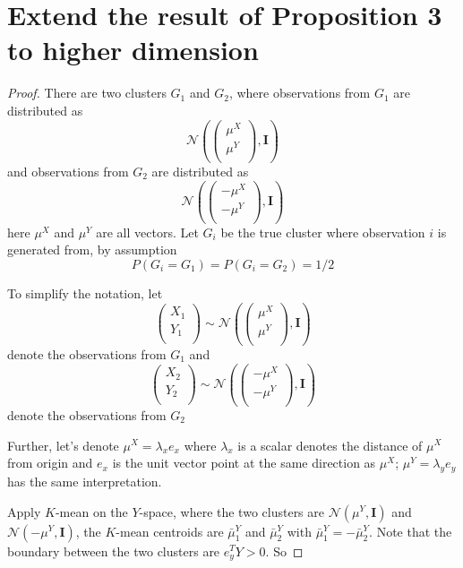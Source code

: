 \documentclass[11pt]{article}
\begin{document}
\section{Extend the result of Proposition 3 to higher dimension}
\begin{proof}
There are two clusters $G_1$ and $G_2$, where observations from $G_1$ are distributed as
\[	\mathcal{N}\left( \begin{pmatrix} 
    \mu^X \\
    \mu^Y \\
  \end{pmatrix}, \mathbf{I} \right)	\]
and observations from $G_2$ are distributed as
\[	\mathcal{N}\left( \begin{pmatrix} 
    -\mu^X \\
    -\mu^Y \\
  \end{pmatrix}, \mathbf{I} \right)	\]
here $\mu^X$ and $\mu^Y$ are all vectors. Let $G_i$ be the true cluster where observation $i$ is generated from, by assumption
\[	P(G_i=G_1) = P(G_i=G_2) = 1/2	\]

To simplify the notation, let 
\[
 \begin{pmatrix} 
    X_1 \\
    Y_1 \\
  \end{pmatrix}  \sim
  \mathcal{N}\left( \begin{pmatrix} 
    \mu^X \\
    \mu^Y \\
  \end{pmatrix}, \mathbf{I} \right)
\]  
denote the observations from $G_1$ and 
\[
 \begin{pmatrix} 
    X_2 \\
    Y_2 \\
  \end{pmatrix}  \sim
  \mathcal{N}\left( \begin{pmatrix} 
    -\mu^X \\
    -\mu^Y \\
  \end{pmatrix}, \mathbf{I} \right)
\]  
denote the observations from $G_2$ 

Further, let's denote $\mu^X = \lambda_x e_x$ where $\lambda_x$ is a scalar denotes the distance of $\mu^X$ from origin and $e_x$ is the unit vector point at the same direction as $\mu^X$; $\mu^Y = \lambda_y e_y$ has the same interpretation.

Apply $K$-mean on the $Y$-space, where the two clusters are $\mathcal{N}\left( \mu^Y, \mathbf{I}\right)$ and  $\mathcal{N}\left( -\mu^Y, \mathbf{I}\right)$, the $K$-mean centroids are $\bar{\mu}^Y_1$ and $\bar{\mu}^Y_2$ with $\bar{\mu}^Y_1 = -\bar{\mu}^Y_2$. Note that the boundary between the two clusters are $e^T_y Y > 0 $. So 


\end{proof}
\end{document}
